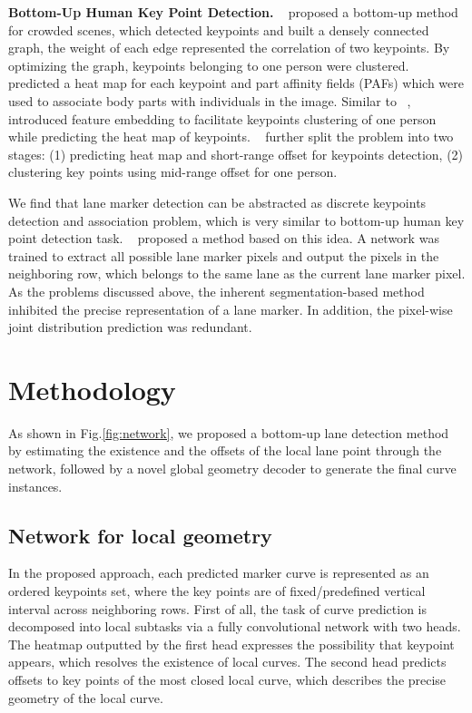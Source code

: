 \documentclass[final]{cvpr}
\begin{document}
\textbf{Bottom-Up Human Key Point Detection.} ~\cite{pishchulin2016deepcut} proposed a bottom-up method for crowded scenes, which detected keypoints and built a densely connected graph, the weight of each edge represented the correlation of two keypoints. By optimizing the graph, keypoints belonging to one person were clustered. ~\cite{cao2017realtime} predicted a heat map for each keypoint and part affinity fields (PAFs) which were used to associate body parts with individuals in the image. Similar to ~\cite{efrat2020semi, neven2018towards}, ~\cite{newell2017associative} introduced feature embedding to facilitate keypoints clustering of one person while predicting the heat map of keypoints. ~\cite{papandreou2018personlab} further split the problem into two stages: (1) predicting heat map and short-range offset for keypoints detection, (2) clustering key points using mid-range offset for one person.

We find that lane marker detection can be abstracted as discrete keypoints detection and association problem, which is very similar to bottom-up human key point detection task. ~\cite{philion2019fastdraw} proposed a method based on this idea. A network was trained to extract all possible lane marker pixels and output the pixels in the neighboring row, which belongs to the same lane as the current lane marker pixel. As the problems discussed above, the inherent segmentation-based method inhibited the precise representation of a lane marker. In addition, the pixel-wise joint distribution prediction was redundant.
\thispagestyle{empty}
\section{Methodology}
As shown in Fig.\ref{fig:network}, we proposed a bottom-up lane detection method by estimating the existence and the offsets of the local lane point through the network, followed by a novel global geometry decoder to generate the final curve instances.

\subsection{Network for local geometry}
In the proposed approach, each predicted marker curve is represented as an ordered keypoints set, where the key points are of fixed/predefined vertical interval  across neighboring rows. First of all, the task of curve prediction is decomposed into local subtasks via a fully convolutional network with two heads. The heatmap outputted by the first head expresses the possibility that keypoint appears, which resolves the existence of local curves. The second head predicts offsets to key points of the most closed local curve, which describes the precise geometry of the local curve.
\end{document}
